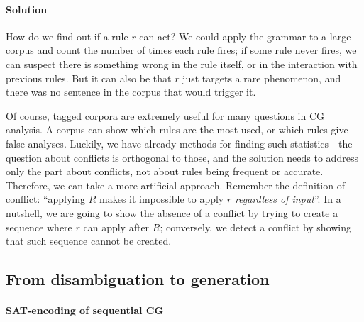 \paragraph{Solution}

How do we find out if a rule $r$ can act?
We could apply the grammar to a large corpus and count the number of times
each rule fires; if some rule never fires, we can suspect there is something wrong
in the rule itself, or in the interaction with previous rules.
But it can also be that $r$ just targets a rare phenomenon, and there was no sentence in the corpus that would trigger it.

Of course, tagged corpora are extremely useful for many questions in CG analysis.
A corpus can show which rules are the most used, or which rules give false analyses.
Luckily, we have already methods for finding such statistics---the question
about conflicts is orthogonal to those, and the solution needs to address only
the part about conflicts, not about rules being frequent or accurate.
Therefore, we can take a more artificial approach. %
Remember the definition of conflict: ``applying $R$ makes it impossible to apply $r$ \emph{regardless of input}''.
In a nutshell, we are going to show the absence of a conflict by trying to create
a sequence where $r$ can apply after $R$; conversely, we detect a conflict by
showing that such sequence cannot be created.




\def\newVar{$\text{\em word}'_\textsc{ RD}$}
\def\oldVar{$\text{\em word}_\textsc{\,RD}$}
\def\eqdef{\Coloneqq}
\def\invConds{\text{invalid condition}}
\def\onlyTrgLeft{\text{only target left}}

\subsection{From disambiguation to generation}

\paragraph{SAT-encoding of sequential CG}
\label{sec:orderedScheme}


